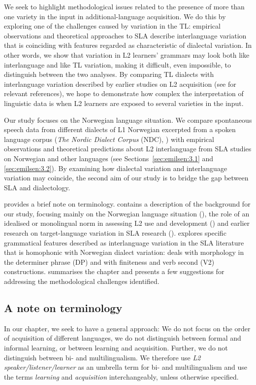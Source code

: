 \documentclass[output=paper,colorlinks,citecolor=brown,modfonts,nonflat]{../langscibook}
\begin{document}
We seek to highlight methodological issues related to the presence of more than one variety in the input in additional-language acquisition. We do this by exploring one of the challenges caused by variation in the TL: empirical observations and theoretical approaches to SLA describe interlanguage variation that is coinciding with features regarded as characteristic of dialectal variation. In other words, we show that variation in L2 learners’ grammars may look both like interlanguage and like TL variation, making it difficult, even impossible, to distinguish between the two analyses. By comparing TL dialects with interlanguage variation described by earlier studies on L2 acquisition (see  for relevant references), we hope to demonstrate how complex the interpretation of linguistic data is when L2 learners are exposed to several varieties in the input. 



Our study focuses on the Norwegian language situation. We compare spontaneous speech data from different dialects of L1 Norwegian excerpted from a spoken language corpus (\textit{The Nordic Dialect Corpus} (NDC), \citealt{JohannessenEtAl2009}) with empirical observations and theoretical predictions about L2 interlanguage from SLA studies on Norwegian and other languages (see Sections~\ref{sec:emilsen:3.1} and \ref{sec:emilsen:3.2}). By examining how dialectal variation and interlanguage variation may coincide, the second aim of our study is to bridge the gap between SLA and dialectology.


 provides a brief note on terminology.  contains a description of the background for our study, focusing mainly on the Norwegian language situation (), the role of an idealised or monolingual norm in assessing L2 use and development () and earlier research on target-language variation in SLA research ().  explores specific grammatical features described as interlanguage variation in the SLA literature that is homophonic with Norwegian dialect variation:  deals with morphology in the determiner phrase (DP) and  with finiteness and verb second (V2) constructions.  summarises the chapter and presents a few suggestions for addressing the methodological challenges identified. 

\subsection{A note on terminology}\label{sec:emilsen:1.1}
In our chapter, we seek to have a general approach: We do not focus on the order of acquisition of different languages, we do not distinguish between formal and informal learning, or between learning and acquisition. Further, we do not distinguish between bi- and multilingualism. We therefore use \textit{L2 speaker/listener/learner} as an umbrella term for bi- and multilingualism and use the terms \textit{learning} and \textit{acquisition} interchangeably, unless otherwise specified.
\end{document}
